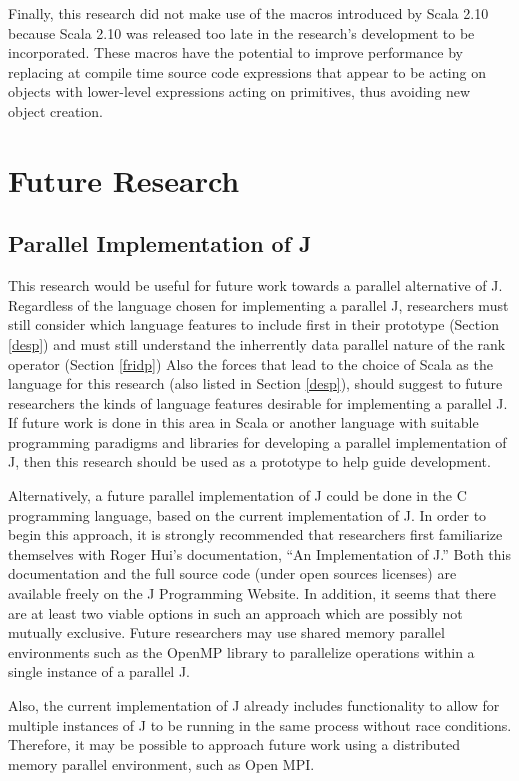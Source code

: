 Finally, this research did not make use of the macros introduced by Scala 2.10\cite{scala210} 
because Scala 2.10 was released too late in the research's development to be incorporated.
These macros have the potential to improve performance 
by replacing at compile time source code expressions that appear to be acting on objects 
with lower-level expressions acting on primitives, thus avoiding new object creation.

\section{Future Research}
\subsection{Parallel Implementation of J}
This research would be useful for future work towards a parallel alternative of J.
Regardless of the language chosen for implementing a parallel J, 
researchers must still consider which language features to include first in their prototype (Section \ref{desp})
and must still understand the inherrently data parallel nature of the rank operator (Section \ref{fridp})
Also the forces that lead to the choice of Scala as the language 
for this research (also listed in Section \ref{desp}), 
should suggest to future researchers the kinds of language features desirable 
for implementing a parallel J. 
If future work is done in this area in Scala 
or another language with suitable programming paradigms and libraries 
for developing a parallel implementation of J, 
then this research should be used as a prototype 
to help guide development.

Alternatively, a future parallel implementation of J
could be done in the C programming language, based on the current implementation of J\cite{ioj}. 
In order to begin this approach, 
it is strongly recommended that researchers first 
familiarize themselves with Roger Hui's documentation, ``An Implementation of J.''
Both this documentation and the full source code (under open sources licenses)
are available freely on the J Programming Website.
In addition, it seems that there are at least two viable options in such an approach 
which are possibly not mutually exclusive.
Future researchers may use shared memory parallel environments
such as the OpenMP library 
to parallelize operations within a single instance of a parallel J.

Also, the current implementation of J already includes 
functionality to allow for multiple instances of J to be running in the same process 
without race conditions.
Therefore, it may be possible to approach future work using 
a distributed memory parallel environment, such as Open MPI\cite{mpi}.

